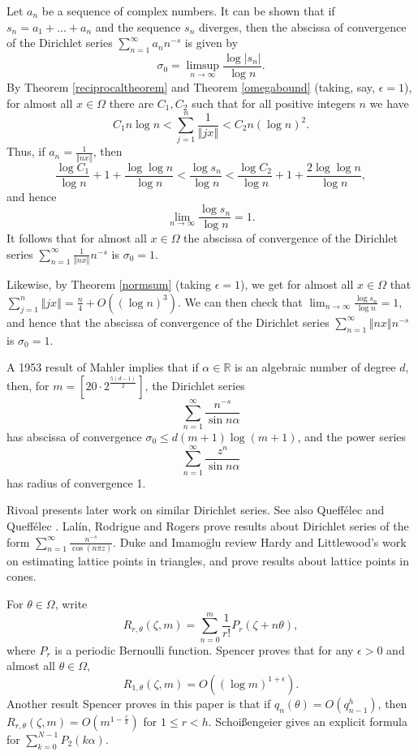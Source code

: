 \documentclass{amsart}
\newcommand{\norm}[1]{\left\Vert #1 \right\Vert}
\begin{document}
Let $a_n$ be a sequence of complex numbers.
It can be  shown \cite[pp.~292--293, \S 9.14]{titchmarsh} that if $s_n=a_1+\ldots+a_n$ and the sequence $s_n$ diverges, then the abscissa of convergence of the Dirichlet series $\sum_{n=1}^\infty a_n n^{-s}$ is given by
\[
\sigma_0=\limsup_{n \to \infty} \frac{\log |s_n|}{\log n}.
\]
By Theorem \ref{reciprocaltheorem} and Theorem \ref{omegabound} (taking, say, $\epsilon=1$), for almost all $x \in \Omega$ there are $C_1,C_2$ such that for all positive integers $n$ we have
\[
C_1 n \log n< \sum_{j=1}^n \frac{1}{\norm{jx}} < C_2 n(\log n)^2.
\]
Thus, if $a_n=\frac{1}{\norm{nx}}$, then
\[
\frac{\log C_1}{\log n} + 1 + \frac{\log \log n}{\log n} < \frac{\log s_n}{\log n} < \frac{\log C_2}{\log n} + 1 + \frac{2 \log \log n}{\log n},
\]
and hence
\[
\lim_{n \to \infty} \frac{\log s_n}{\log n}=1.
\]
It follows that for almost all $x \in \Omega$ the abscissa of convergence of the Dirichlet series $\sum_{n=1}^\infty \frac{1}{\norm{nx}} n^{-s}$ is $\sigma_0=1$.

Likewise, by Theorem \ref{normsum} (taking $\epsilon=1$), we get for almost all $x \in \Omega$ that $\sum_{j=1}^n \norm{jx}=\frac{n}{4}+O\left((\log n)^3\right)$.
We can then check that $\lim_{n \to \infty} \frac{\log s_n}{\log n}=1$, and hence that the abscissa of convergence of the Dirichlet series
$\sum_{n=1}^\infty \norm{nx} n^{-s}$ is $\sigma_0=1$.




A 1953 result of Mahler \cite[pp. 107--108]{feldman} implies that if $\alpha \in \mathbb{R}$ is
an algebraic number of degree $d$, then, for $m=[20\cdot 2^{\frac{5(d-1)}{2}}]$, the Dirichlet series
\[
\sum_{n=1}^\infty \frac{n^{-s}}{\sin n\alpha}
\]
has abscissa of convergence $\sigma_0 \leq d(m+1)\log(m+1)$, and the power series
\[
\sum_{n=1}^\infty \frac{z^n}{\sin n\alpha}
\]
has radius of convergence 1.






Rivoal \cite{MR2928508} presents later work on similar Dirichlet series. See also Queff\'elec and Queff\'elec \cite{queffelec}.
Lal\'in, Rodrigue and Rogers \cite{secant} prove results about Dirichlet series of the form
$\sum_{n=1}^\infty \frac{n^{-s}}{\cos(n \pi z)}$.
Duke and Imamo{\=g}lu \cite{MR2127435} review Hardy and Littlewood's work on estimating lattice points in triangles, and 
prove results about lattice points in cones.


For $\theta \in \Omega$,  write
\[
R_{r,\theta}(\zeta,m)=\sum_{n=0}^m \frac{1}{r!} P_r(\zeta+n\theta),
\]
where $P_r$ is a periodic Bernoulli function.
Spencer \cite{spencer} proves that for any $\epsilon>0$ and almost all $\theta \in \Omega$, 
\[
R_{1,\theta}(\zeta,m) = O\left( (\log m)^{1+\epsilon}\right).
\]
Another result Spencer proves in this paper is that if $q_n(\theta) = O(q_{n-1}^h)$, then $R_{r,\theta}(\zeta,m)=O(m^{1-\frac{r}{h}})$ for $1 \leq r < h$.
Schoi{\ss}engeier \cite{MR1012966} gives an explicit formula for $\sum_{k=0}^{N-1} P_2(k\alpha)$.
\end{document}

